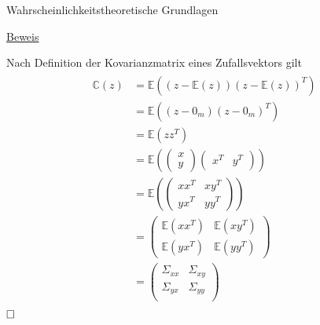 \documentclass[
  8pt,
  ignorenonframetext,
]{beamer}
\begin{document}
\begin{frame}{Wahrscheinlichkeitstheoretische Grundlagen}
\protect\hypertarget{wahrscheinlichkeitstheoretische-grundlagen-1}{}
\footnotesize

\underline{Beweis}

\renewcommand{\arraystretch}{1.2}

Nach Definition der Kovarianzmatrix eines Zufallsvektors gilt
\begin{align}
\begin{split}
\mathbb{C}(z)
& = \mathbb{E}\left((z - \mathbb{E}(z))(z - \mathbb{E}(z))^T \right) \\
& = \mathbb{E}\left((z - 0_m)(z - 0_m)^T \right) \\
& = \mathbb{E}\left(zz^T\right)\\
& = \mathbb{E}\left(\begin{pmatrix} x \\ y \end{pmatrix} \begin{pmatrix} x^T & y^T \end{pmatrix} \right) \\
& = \mathbb{E}\left(\begin{pmatrix} xx^T & xy^T \\ yx^T & yy^T \end{pmatrix}\right)
\\
& =
\begin{pmatrix}
\mathbb{E}\left(xx^T\right) & \mathbb{E}\left(xy^T\right) \\
\mathbb{E}\left(yx^T\right) & \mathbb{E}\left(yy^T\right)
\end{pmatrix}
\\
& =
\begin{pmatrix}
\Sigma_{xx} & \Sigma_{xy} \\
\Sigma_{yx} & \Sigma_{yy} \\
\end{pmatrix}
\end{split}
\end{align} \(\hfill\Box\)
\end{frame}
\end{document}
